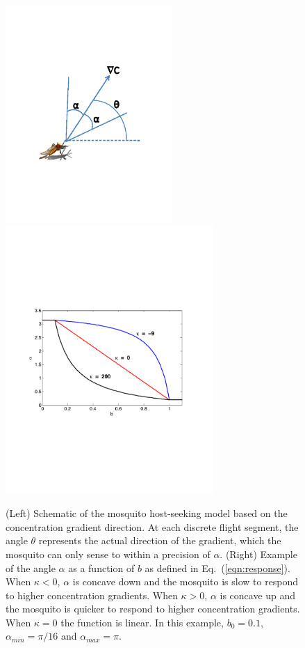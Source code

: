 \documentclass[12pt]{article}
\newcommand{\mycaption}[1]{\caption{#1}}
\begin{document}
\begin{figure}[hbt]
\centering
 \includegraphics[width=2.5in]{figures/GradientWalkSchematic.pdf}\hskip30pt
 \includegraphics[width=3.1in]{figures/wnvFig1.pdf}
\mycaption{(Left) Schematic of the mosquito host-seeking model based on the concentration gradient direction. At each discrete flight segment, the angle $\theta$ represents the actual direction of the gradient, which the mosquito can only sense to within a precision of $\alpha$.  (Right) Example of the angle $\alpha$ as a function of $b$ as defined in Eq.~(\ref{eqn:response}). When $\kappa < 0 $, $\alpha$ is concave down and the mosquito is slow to respond to higher concentration gradients.  When $\kappa >0 $, $\alpha$ is concave up and the mosquito is quicker to respond to higher concentration gradients. When $\kappa = 0$ the function is linear. In this example, $b_0 = 0.1$, $\alpha_{min} = \pi/16$ and $\alpha_{max} = \pi$.}

\label{MosquitoGradient}
\end{figure}
\end{document}
